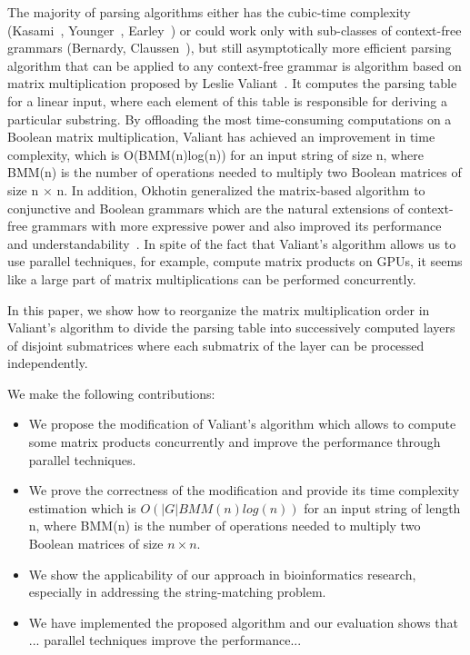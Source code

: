 The majority of parsing algorithms either has the cubic-time complexity (Kasami~\cite{Kas}, Younger~\cite{Younger:1966:CLP:1441427.1442019}, Earley~\cite{Earley:1970:ECP:362007.362035}) or could work only with sub-classes of context-free grammars (Bernardy, Claussen~\cite{Bernardy:2013:EDP:2544174.2500576}), but still asymptotically more efficient parsing algorithm that can be applied to any context-free grammar is algorithm based on matrix multiplication proposed by Leslie Valiant~\cite{Valiant:1975:GCR:1739932.1740048}. It computes the parsing table for a linear input, where each element of this table is responsible for deriving a particular substring. By offloading the most time-consuming computations on a Boolean matrix multiplication, Valiant has achieved an improvement in time complexity, which is O(BMM(n)log(n)) for an input string of size n, where BMM(n) is the number of operations needed to multiply two Boolean matrices of size n $\times$ n. In addition, Okhotin generalized the matrix-based algorithm to conjunctive and Boolean grammars which are the natural extensions of context-free grammars with more expressive power and also improved its performance and understandability~\cite{Okhotin:2014:PMM:2565359.2565379}. In spite of the fact that Valiant's algorithm allows us to use parallel techniques, for example, compute matrix products on GPUs, it seems like a large part of matrix multiplications can be performed concurrently.

In this paper, we show how to reorganize the matrix multiplication order in Valiant's algorithm to divide the parsing table into successively computed layers of disjoint submatrices where each submatrix of the layer can be processed independently.

We make the following contributions:
\begin{itemize}
  \item We propose the modification of Valiant's algorithm which allows to compute some matrix products concurrently and improve the performance through parallel techniques.
  \item We prove the correctness of the modification and provide its time complexity estimation which is $O(|G|BMM(n)log(n))$ for an input string of length n, where BMM(n) is the number of operations needed to multiply two Boolean matrices of size $n \times n$.
  \item We show the applicability of our approach in bioinformatics research, especially in addressing the string-matching problem.
  \item We have implemented the proposed algorithm and our evaluation shows that ... parallel techniques improve the performance...
\end{itemize}


